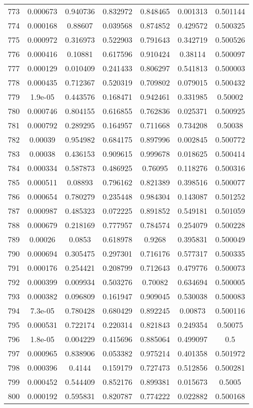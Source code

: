 \begin{table}
\begin{tabular}{c|c|c|c|c|c|c}
773 & 0.000673 & 0.940736 & 0.832972 & 0.848465 & 0.001313 & 0.501144\\
774 & 0.000168 & 0.88607 & 0.039568 & 0.874852 & 0.429572 & 0.500325\\
775 & 0.000972 & 0.316973 & 0.522903 & 0.791643 & 0.342719 & 0.500526\\
776 & 0.000416 & 0.10881 & 0.617596 & 0.910424 & 0.38114 & 0.500097\\
777 & 0.000129 & 0.010409 & 0.241433 & 0.806297 & 0.541813 & 0.500003\\
778 & 0.000435 & 0.712367 & 0.520319 & 0.709802 & 0.079015 & 0.500432\\
779 & 1.9e-05 & 0.443576 & 0.168471 & 0.942461 & 0.331985 & 0.50002\\
780 & 0.000746 & 0.804155 & 0.616855 & 0.762836 & 0.025371 & 0.500925\\
781 & 0.000792 & 0.289295 & 0.164957 & 0.711668 & 0.734208 & 0.50038\\
782 & 0.00039 & 0.954982 & 0.684175 & 0.897996 & 0.002845 & 0.500772\\
783 & 0.00038 & 0.436153 & 0.909615 & 0.999678 & 0.018625 & 0.500414\\
784 & 0.000334 & 0.587873 & 0.486925 & 0.76095 & 0.118276 & 0.500316\\
785 & 0.000511 & 0.08893 & 0.796162 & 0.821389 & 0.398516 & 0.500077\\
786 & 0.000654 & 0.780279 & 0.235448 & 0.984304 & 0.143087 & 0.501252\\
787 & 0.000987 & 0.485323 & 0.072225 & 0.891852 & 0.549181 & 0.501059\\
788 & 0.000679 & 0.218169 & 0.777957 & 0.784574 & 0.254079 & 0.500228\\
789 & 0.00026 & 0.0853 & 0.618978 & 0.9268 & 0.395831 & 0.500049\\
790 & 0.000694 & 0.305475 & 0.297301 & 0.716176 & 0.577317 & 0.500335\\
791 & 0.000176 & 0.254421 & 0.208799 & 0.712643 & 0.479776 & 0.500073\\
792 & 0.000399 & 0.009934 & 0.503276 & 0.70082 & 0.634694 & 0.500005\\
793 & 0.000382 & 0.096809 & 0.161947 & 0.909045 & 0.530038 & 0.500083\\
794 & 7.3e-05 & 0.780428 & 0.680429 & 0.892245 & 0.00873 & 0.500116\\
795 & 0.000531 & 0.722174 & 0.220314 & 0.821843 & 0.249354 & 0.50075\\
796 & 1.8e-05 & 0.004229 & 0.415696 & 0.885064 & 0.499097 & 0.5\\
797 & 0.000965 & 0.838906 & 0.053382 & 0.975214 & 0.401358 & 0.501972\\
798 & 0.000396 & 0.4144 & 0.159179 & 0.727473 & 0.512856 & 0.500281\\
799 & 0.000452 & 0.544409 & 0.852176 & 0.899381 & 0.015673 & 0.5005\\
800 & 0.000192 & 0.595831 & 0.820787 & 0.774222 & 0.022882 & 0.500168\\
\end{tabular}
\end{table}
